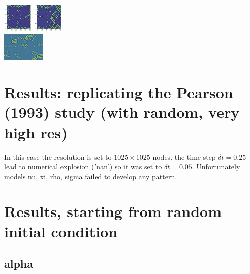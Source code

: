 \begin{itemize}
\includegraphics[height=1.4cm]{python_codes/fieldstone_171/pearson93_hr/pi_solution_0075000_u.png}
\includegraphics[height=1.4cm]{python_codes/fieldstone_171/pearson93_hr/pi_solution_final_u.png}\\
\includegraphics[height=1.4cm]{python_codes/fieldstone_171/images/munafo_pi}

\end{itemize}


\section*{Results: replicating the Pearson (1993) study (with random, very high res)}

In this case the resolution is set to $1025\times 1025$ nodes.
the time step $\delta t=0.25$ lead to numerical explosion ('nan') so 
it was set to $\delta t=0.05$.
Unfortunately models nu, xi, rho, sigma failed to develop any pattern.



\newpage
\section*{Results, starting from random initial condition}

\subsection*{alpha}

